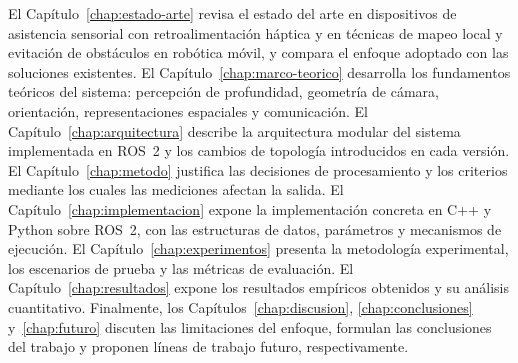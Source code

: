 El Capítulo~\ref{chap:estado-arte} revisa el estado del arte en dispositivos de asistencia sensorial
con retroalimentación háptica y en técnicas de mapeo local y evitación de obstáculos en robótica
móvil, y compara el enfoque adoptado con las soluciones existentes.
El Capítulo~\ref{chap:marco-teorico} desarrolla los fundamentos teóricos del sistema:
percepción de profundidad, geometría de cámara, orientación, representaciones espaciales y
comunicación.
El Capítulo~\ref{chap:arquitectura} describe la arquitectura modular del sistema implementada en
ROS~2 y los cambios de topología introducidos en cada versión.
El Capítulo~\ref{chap:metodo} justifica las decisiones de procesamiento y los criterios mediante los
cuales las mediciones afectan la salida.
El Capítulo~\ref{chap:implementacion} expone la implementación concreta en C++ y Python sobre ROS~2,
con las estructuras de datos, parámetros y mecanismos de ejecución.
El Capítulo~\ref{chap:experimentos} presenta la metodología experimental, los escenarios de prueba y
las métricas de evaluación.
El Capítulo~\ref{chap:resultados} expone los resultados empíricos obtenidos y su análisis
cuantitativo.
Finalmente, los Capítulos~\ref{chap:discusion}, \ref{chap:conclusiones} y~\ref{chap:futuro} discuten
las limitaciones del enfoque, formulan las conclusiones del trabajo y proponen líneas de trabajo
futuro, respectivamente.
